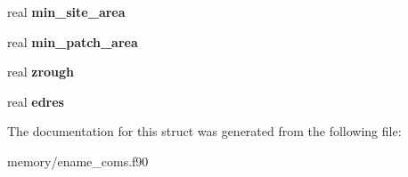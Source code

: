 \begin{DoxyCompactItemize}
\item 
\hypertarget{structename__coms_1_1ename__vars_ac833ed6581d85c10f8317a93d40cc9b8}{
real {\bfseries min\_\-site\_\-area}}
\label{structename__coms_1_1ename__vars_ac833ed6581d85c10f8317a93d40cc9b8}

\item 
\hypertarget{structename__coms_1_1ename__vars_a273f97fba1fc90af65c28ee6d7f525d7}{
real {\bfseries min\_\-patch\_\-area}}
\label{structename__coms_1_1ename__vars_a273f97fba1fc90af65c28ee6d7f525d7}

\item 
\hypertarget{structename__coms_1_1ename__vars_a3d58740a12137c047498e7ea2e9482d7}{
real {\bfseries zrough}}
\label{structename__coms_1_1ename__vars_a3d58740a12137c047498e7ea2e9482d7}

\item 
\hypertarget{structename__coms_1_1ename__vars_ad0785dccc376081a8249a9d2f4ddc43d}{
real {\bfseries edres}}
\label{structename__coms_1_1ename__vars_ad0785dccc376081a8249a9d2f4ddc43d}

\end{DoxyCompactItemize}


The documentation for this struct was generated from the following file:\begin{DoxyCompactItemize}
\item 
memory/ename\_\-coms.f90\end{DoxyCompactItemize}
